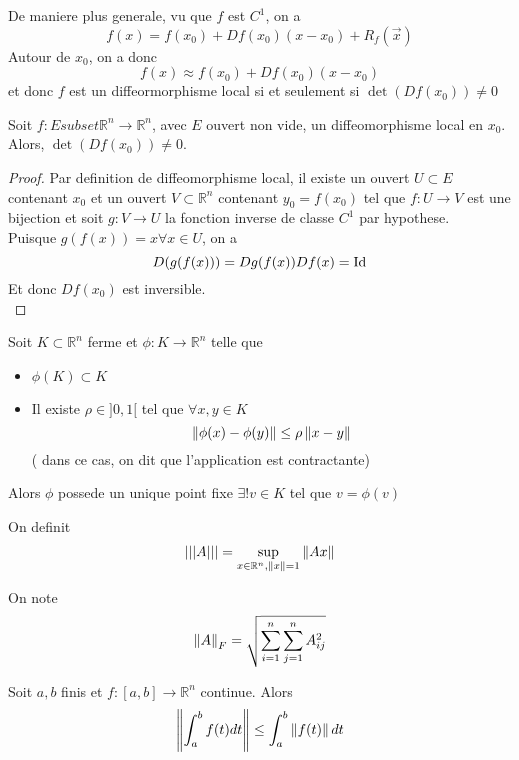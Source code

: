 \documentclass[../main.tex]{subfiles}
\begin{document}
De maniere plus generale, vu que $f$ est $C^{1}$, on a 
\[ 
	f( x) = f( x_0)  + Df( x_0) ( x-x_0)  + R_f( \vec{x}) 
\]
Autour de $x_0$, on a donc
\[ 
	f( x) \approx f( x_0) + Df( x_0) ( x-x_0) 
\]
et donc $f$ est un diffeormorphisme local si et seulement si $\det ( Df( x_0) ) \neq 0$
\begin{thm}
	Soit $f: E subset \mathbb{R}^n\to \mathbb{R}^n$, avec $E$ ouvert non vide, un diffeomorphisme local en $x_0$. Alors, $\det ( D f( x_0) ) \neq 0$.	
\end{thm}
\begin{proof}
	Par definition de diffeomorphisme local, il existe un ouvert $U \subset E$ contenant $x_0$ et un ouvert $V \subset \mathbb{R}^n $ contenant $y_0 = f( x_0) $ tel que $f: U \to V$ est une bijection et soit $g: V \to U$ la fonction inverse de classe $C^1$ par hypothese.\\
	Puisque $g( f( x) )=x \forall x \in U $, on a 
	\[ 
		D( g( f( x) ) ) = Dg( f( x) ) Df( x) = \operatorname*{Id}
	\]
	Et donc $Df( x_0) $ est inversible.\\
\end{proof}
\begin{thm}
Soit $K \subset \mathbb{R}^n$ ferme et $\phi: K \to \mathbb{R}^n$ telle que
\begin{itemize}
	\item $\phi( K) \subset K $
	\item Il existe $\rho \in ]0,1[$ tel que $\forall x,y \in K$ 
		\[ 
	\left\lVert \phi( x) - \phi( y) \right\rVert  \leq \rho \left\lVert x-y\right\rVert 
		\]
		( dans ce cas, on dit que l'application est contractante) 
		
\end{itemize}
Alors $\phi$ possede un unique point fixe $\exists ! v \in K$ tel que $v= \phi( v) $


\end{thm}
\begin{defn}
	On definit
	\begin{align*}
		\left\vert\left\vert\left\vert A\right\vert\right\vert\right\vert = \sup_{x \in \mathbb{R}^n, \left\lVert x\right\rVert=1} \left\lVert A x\right\rVert 
	\end{align*}
	
\end{defn}
\begin{defn}
	On note
\begin{align*}
\left\lVert A\right\rVert_F = \sqrt{ \sum_{i=1}^{ n} \sum_{j=1}^{ n}A_{ij} ^{2}} 
\end{align*}

\end{defn}
\begin{lemma}
	Soit $a,b$ finis et $f: [ a,b] \to \mathbb{R}^n$ continue. Alors
	\begin{align*}
		\left\lVert  \int_{ a }^{ b }f( t) dt\right\rVert \leq \int_{ a }^{ b }\left\lVert f( t) \right\rVert dt
	\end{align*}
	
\end{lemma}
\end{document}
